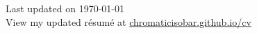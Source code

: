 \documentclass[12pt,a4paper,sans]{moderncv}
\begin{document}
\makecvtitle



\newpage



\vfill
\begin{flushright}\color{gray}
Last updated on \today\\
View my updated r\'esum\'e at \href{https://chromaticisobar.github.io/cv/}{chromaticisobar.github.io/cv}
\end{flushright}
\end{document}
